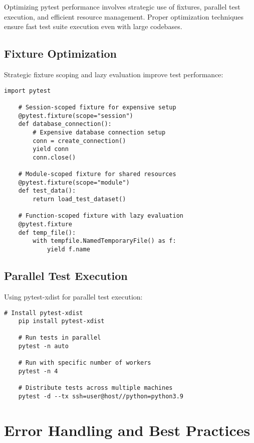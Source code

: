 Optimizing pytest performance involves strategic use of fixtures, parallel test execution, and efficient resource management. Proper optimization techniques ensure fast test suite execution even with large codebases.

\subsection{Fixture Optimization}
\label{subsec:fixture_optimization}

Strategic fixture scoping and lazy evaluation improve test performance:

\begin{lstlisting}[language=MyPython, caption={Fixture Optimization Strategies}, label={lst:fixture_optimization}]
	import pytest
	
	# Session-scoped fixture for expensive setup
	@pytest.fixture(scope="session")
	def database_connection():
	    # Expensive database connection setup
	    conn = create_connection()
	    yield conn
	    conn.close()
	
	# Module-scoped fixture for shared resources
	@pytest.fixture(scope="module")
	def test_data():
	    return load_test_dataset()
	
	# Function-scoped fixture with lazy evaluation
	@pytest.fixture
	def temp_file():
	    with tempfile.NamedTemporaryFile() as f:
	        yield f.name
\end{lstlisting}

\subsection{Parallel Test Execution}
\label{subsec:parallel_execution}

Using pytest-xdist for parallel test execution:

\begin{lstlisting}[style=bashstyle, caption={Parallel Test Execution}]
	# Install pytest-xdist
	pip install pytest-xdist
	
	# Run tests in parallel
	pytest -n auto
	
	# Run with specific number of workers
	pytest -n 4
	
	# Distribute tests across multiple machines
	pytest -d --tx ssh=user@host//python=python3.9
\end{lstlisting}

\section{Error Handling and Best Practices}
\label{sec:best_practices}

